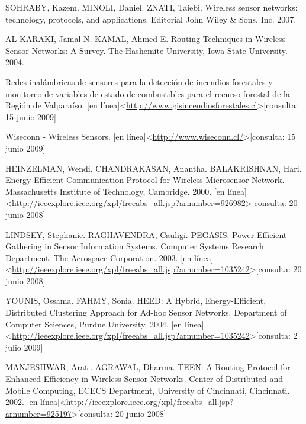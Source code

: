 
\begin{thebibliography}{99}
\begin{sloppypar}
 SOHRABY, Kazem. MINOLI, Daniel. ZNATI, Taiebi. Wireless sensor networks: technology, protocols, and applications. Editorial John Wiley \& Sons, Inc. 2007.

 AL-KARAKI, Jamal N. KAMAL, Ahmed E. Routing Techniques in Wireless Sensor Networks: A Survey. The Hashemite University, Iowa State University. 2004.

 Redes inalámbricas de sensores para la detección de incendios forestales y monitoreo de variables de estado de combustibles para el recurso forestal de la Región de Valparaíso. [en línea]\textless \url{http://www.gisincendiosforestales.cl}\textgreater[consulta: 15 junio 2009] 

 Wiseconn - Wireless Sensors. [en línea]\textless \url{http://www.wiseconn.cl/}\textgreater[consulta: 15 junio 2009] 

 HEINZELMAN, Wendi. CHANDRAKASAN, Anantha. BALAKRISHNAN, Hari. Energy-Efficient Communication Protocol for Wireless  Microsensor Network. Massachusetts Institute of Technology, Cambridge. 2000. [en línea]\textless \url{http://ieeexplore.ieee.org/xpl/freeabs_all.jsp?arnumber=926982}\textgreater[consulta: 20 junio 2008] 

 LINDSEY, Stephanie. RAGHAVENDRA, Cauligi. PEGASIS: Power-Efficient Gathering in Sensor Information Systems. Computer Systems Research Department. The Aerospace Corporation. 2003. [en línea]\textless \url{http://ieeexplore.ieee.org/xpl/freeabs_all.jsp?arnumber=1035242}\textgreater[consulta: 20 junio 2008] 

 YOUNIS, Ossama. FAHMY, Sonia. HEED: A Hybrid, Energy-Efficient, Distributed Clustering Approach for Ad-hoc Sensor Networks. Department of Computer Sciences, Purdue University. 2004. [en línea]\textless \url{http://ieeexplore.ieee.org/xpl/freeabs_all.jsp?arnumber=1035242}\textgreater[consulta:  2 julio 2009] 

 MANJESHWAR, Arati. AGRAWAL, Dharma. TEEN: A Routing Protocol for Enhanced Efficiency in Wireless Sensor Networks. Center of Distributed and Mobile Computing, ECECS Department, University of Cincinnati, Cincinnati. 2002. [en línea]\textless \url{http://ieeexplore.ieee.org/xpl/freeabs_all.jsp?arnumber=925197}\textgreater[consulta: 20 junio 2008] 


\end{sloppypar}
\end{thebibliography}

